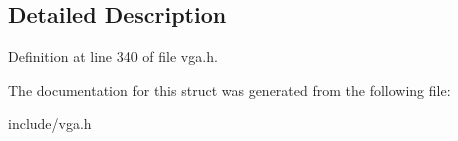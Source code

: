 \subsection{Detailed Description}


Definition at line 340 of file vga.\-h.



The documentation for this struct was generated from the following file\-:\begin{DoxyCompactItemize}
\item 
include/vga.\-h\end{DoxyCompactItemize}
